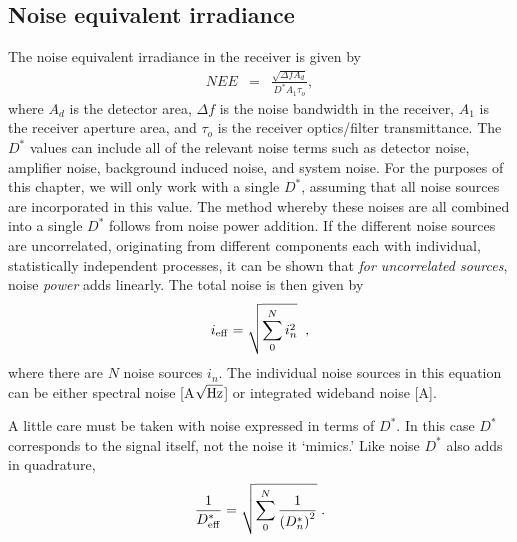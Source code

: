 \subsection{Noise equivalent irradiance}
\noindent
The noise equivalent irradiance in the receiver is given by \cite{Willers2013}
\begin{eqnarray}
NEE&=& \frac{
\sqrt{\Delta f A_d}
}{
D^\ast A_1 \tau_o
},
\label{lrfnoise}\label{laserrxn}
\end{eqnarray}
where 
$A_d$ is the detector area, 
$\Delta f$ is the noise bandwidth in the receiver, 
$A_1$ is the receiver aperture area, and 
$\tau_o$ is the receiver optics/filter transmittance. The
$D^\ast$ values can include all of the relevant noise terms such as detector noise, amplifier noise, background induced noise, and system noise. 
For the purposes of this chapter, we will only work with a single $D^\ast$, assuming that all noise sources are incorporated in this value.
The method whereby these noises are all combined into a single $D^\ast$ follows from noise power addition. If the different noise sources are uncorrelated, originating from different components each with individual, statistically independent processes, it can be shown that \textit{for uncorrelated sources},  noise \textit{power} adds linearly. The total noise is then given by
\begin{equation}
i_{\rm eff}=\sqrt{\sum_0^N i_n^2}\;\;,\label{eq:combinenoisesources}
\end{equation}
where there are $N$ noise sources $i_n$. The individual noise sources in this equation can be either spectral noise [A$\sqrt{\rm Hz}$] or integrated wideband noise [A].

A little care must be taken with noise expressed in terms of $D^\ast$. In this case $D^\ast$ corresponds to the signal itself, not the noise it `mimics.' 
Like noise $D^\ast$ also adds in quadrature,
\begin{equation}
\frac{1}{D^\ast_{\rm eff}}=\sqrt{\sum_0^N 
\frac{1}{\left(D^\ast_n\right)^2}
}\;.\label{eq:combinenoiseDeeStar}
\end{equation}


